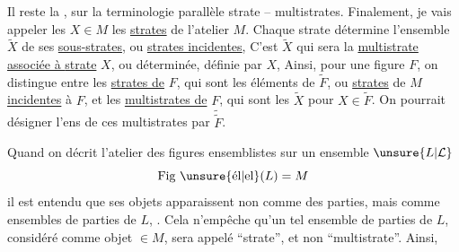 Il reste la , sur la terminologie parallèle strate -- multistrates. Finalement, je vais appeler les $X\in M$ les \uline{strates} de l'atelier $M$. Chaque strate détermine l'ensemble $\widetilde X$ de ses \uline{sous-strates}, ou \uline{strates incidentes}, C'est $\widetilde X$ qui sera la \uline{multistrate associée à } \uline{strate} $X$, ou déterminée, définie par $X$, 
Ainsi, pour une figure $F$, on distingue entre les \uline{strates de} $F$, qui sont les éléments de $\widetilde F$, ou \uline{strates} de $M$ \uline{incidentes} à $F$, et les \uline{multistrates de} $F$, qui sont les $\widetilde X$ pour $X\in\widetilde F$. On pourrait désigner l'ens de ces multistrates par $\widetilde{\widetilde F}$.

Quand on décrit l'atelier des figures  ensemblistes sur un ensemble $\unsure{L|\mathcal L}$
\[
\text{Fig \unsure{él|el}}(L)=M
\]
il est entendu que ses objets apparaissent non comme des parties, mais  comme  ensembles de parties de $L$, . Cela n'empêche qu'un tel ensemble de parties de $L$, considéré comme objet $\in M$, sera appelé ``strate'', et non ``multistrate''. Ainsi,
